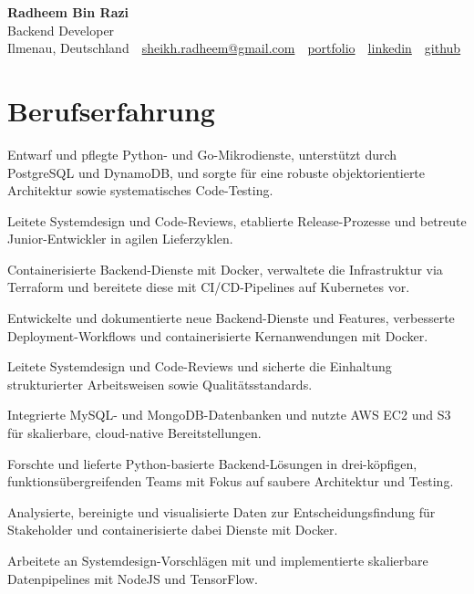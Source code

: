 \documentclass[11pt,a4paper]{resume}
\makeatletter
\newcommand{\Portfolio}{https://radheem.github.io/my-cv}
\newcommand{\PortfolioText}{portfolio}
\newcommand{\GitHub}{https://github.com/radheem}
\newcommand{\LinkedIn}{https://www.linkedin.com/in/radheem-razi}
\newcommand{\Email}{sheikh.radheem@gmail.com}
\makeatother
\begin{document}
\clearpage
{}

\begin{center}
  {\huge\bfseries Radheem Bin Razi}\\[3pt]
  {\large Backend Developer}\\[6pt]
  \small
  Ilmenau, Deutschland \,\textbar\,
  \href{mailto:\Email}{\Email} \,\textbar\,
  \href{\Portfolio}{\PortfolioText} \,\textbar\,
  \href{\LinkedIn}{linkedin} \,\textbar\,
  \href{\GitHub}{github}
\end{center}
\vspace{2pt}

\section{Berufserfahrung}

\bullets
  \item Entwarf und pflegte Python- und Go-Mikrodienste, unterstützt durch PostgreSQL und DynamoDB, und sorgte für eine robuste objektorientierte Architektur sowie systematisches Code-Testing.
  \item Leitete Systemdesign und Code-Reviews, etablierte Release-Prozesse und betreute Junior-Entwickler in agilen Lieferzyklen.
  \item Containerisierte Backend-Dienste mit Docker, verwaltete die Infrastruktur via Terraform und bereitete diese mit CI/CD-Pipelines auf Kubernetes vor.
\bulletsend
\vspace{3pt}
\bullets
  \item Entwickelte und dokumentierte neue Backend-Dienste und Features, verbesserte Deployment-Workflows und containerisierte Kernanwendungen mit Docker.
  \item Leitete Systemdesign und Code-Reviews und sicherte die Einhaltung strukturierter Arbeitsweisen sowie Qualitätsstandards.
  \item Integrierte MySQL- und MongoDB-Datenbanken und nutzte AWS EC2 und S3 für skalierbare, cloud-native Bereitstellungen.
\bulletsend
\vspace{3pt}
\bullets
  \item Forschte und lieferte Python-basierte Backend-Lösungen in drei-köpfigen, funktionsübergreifenden Teams mit Fokus auf saubere Architektur und Testing.
  \item Analysierte, bereinigte und visualisierte Daten zur Entscheidungsfindung für Stakeholder und containerisierte dabei Dienste mit Docker.
  \item Arbeitete an Systemdesign-Vorschlägen mit und implementierte skalierbare Datenpipelines mit NodeJS und TensorFlow.
\bulletsend
\vspace{3pt}
\end{document}
